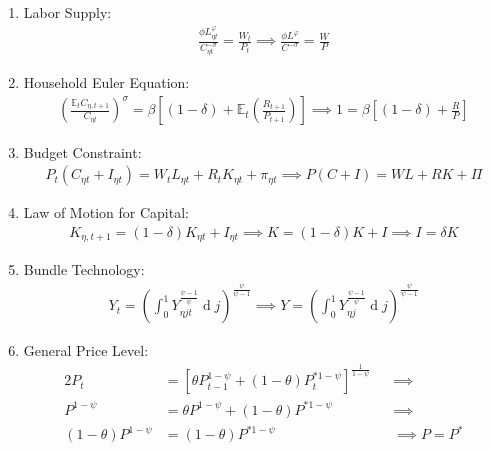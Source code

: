 \documentclass[
	12pt,
	]{article}
\numberwithin{equation}{section}
\DeclareMathOperator{\dif}{d}
\theoremstyle{definition}
\theoremstyle{plain}
\theoremstyle{plain}
\theoremstyle{plain}
\begin{document}
\begin{enumerate}
	\item Labor Supply:
	\begin{align}
		\label{eq:ss-household-labor-supply}
		\frac{\phi L_{\eta t}^{\varphi}}{C_{\eta t}^{-\sigma}} = \frac{W_t}{P_t} \implies
		\frac{\phi L^{\varphi}}{C^{-\sigma}} = \frac{W}{P}
	\end{align}
	
	\item Household Euler Equation: 
	\begin{align}
		\label{eq:ss-household-euler-equation}
		\left( \frac{\mathbb{E}_t C_{\eta, t+1}}{C_{\eta t}} \right)^\sigma = \beta \left[ (1-\delta) + \mathbb{E}_t \left(\frac{R_{t+1}}{P_{t+1}}\right) \right] \implies 
		1 = \beta \left[ (1-\delta) + \frac{R}{P} \right]
	\end{align}
	
	\item Budget Constraint: 
	\begin{align}
		\label{eq:ss-household-budget-constraint}
		P_t (C_{\eta t} + I_{\eta t}) = W_t L_{\eta t} + R_t K_{\eta t} + \pi_{\eta t} \implies 
		P (C + I) = W L + R K + \Pi
	\end{align}
	
	\item Law of Motion for Capital:
	\begin{align}
		\label{eq:ss-law-of-motion-for-capital}
		K_{\eta, t+1} = (1-\delta)K_{\eta t} + I_{\eta t} \implies
		K = (1-\delta)K + I \implies I = \delta K
	\end{align}
	
	\item Bundle Technology:
	\begin{align}
		\label{eq:ss-final-good-firm-bundle-rule}
		Y_t = \left( \int_{0}^{1} Y_{\eta jt}^{\frac{\psi-1}{\psi}} \dif j \right)^{\frac{\psi}{\psi-1}} \implies 
		Y = \left( \int_{0}^{1} Y_{\eta j}^{\frac{\psi-1}{\psi}} \dif j \right)^{\frac{\psi}{\psi-1}}
	\end{align}
	
	\item General Price Level:
	\begin{alignat}{2}
		\label{eq:ss-general-price-level}
		P_t &= \left[ \theta P_{t-1}^{1-\psi} + (1-\theta) P_t^{\ast 1-\psi} \right]^\frac{1}{1-\psi} &&\implies \nonumber \\
		P^{1-\psi} &= \theta P^{1-\psi} + (1-\theta) P^{\ast 1-\psi} &&\implies \nonumber \\ 
		(1-\theta) P^{1-\psi} &= (1-\theta) P^{\ast 1-\psi} &&\implies P = P^\ast
	\end{alignat}
	

\end{enumerate}
\end{document}

